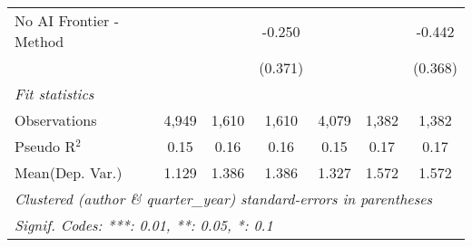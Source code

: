 \begin{tabular}{lcccccc}
   No AI Frontier - Method &         &              & -0.250      &               &               & -0.442\\   
                           &         &              & (0.371)     &               &               & (0.368)\\   
   \midrule
   \emph{Fit statistics}\\
   Observations            & 4,949   & 1,610        & 1,610       & 4,079         & 1,382         & 1,382\\  
   Pseudo R$^2$            & 0.15    & 0.16         & 0.16        & 0.15          & 0.17          & 0.17\\  
Mean(Dep. Var.) & 1.129 & 1.386 & 1.386 & 1.327 & 1.572 & 1.572 \\
   \midrule \midrule
   \multicolumn{7}{l}{\emph{Clustered (author \& quarter\_year) standard-errors in parentheses}}\\
   \multicolumn{7}{l}{\emph{Signif. Codes: ***: 0.01, **: 0.05, *: 0.1}}\\
\end{tabular}
\par\endgroup
